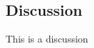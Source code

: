 \begin{refsection}
\chapter{Discussion} %
\label{Discussion}

This is a discussion

\end{refsection}

